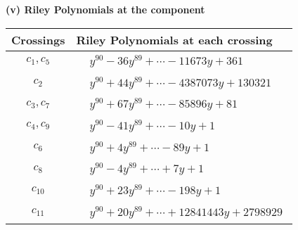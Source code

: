 \documentclass[1p]{elsarticle_modified}
\theoremstyle{definition}
\begin{document}
\newpage\renewcommand{\arraystretch}{1}
\flushleft \textbf{(v) Riley Polynomials at the component}\newline \\
\begin{tabular}{m{50pt}|m{274pt}}
Crossings & \hspace{64pt}Riley Polynomials at each crossing \\
\hline $$\begin{aligned}c_{1},c_{5}\end{aligned}$$&$\begin{aligned}
&y^{90}-36 y^{89}+\cdots-11673 y+361
\end{aligned}$\\
\hline $$\begin{aligned}c_{2}\end{aligned}$$&$\begin{aligned}
&y^{90}+44 y^{89}+\cdots-4387073 y+130321
\end{aligned}$\\
\hline $$\begin{aligned}c_{3},c_{7}\end{aligned}$$&$\begin{aligned}
&y^{90}+67 y^{89}+\cdots-85896 y+81
\end{aligned}$\\
\hline $$\begin{aligned}c_{4},c_{9}\end{aligned}$$&$\begin{aligned}
&y^{90}-41 y^{89}+\cdots-10 y+1
\end{aligned}$\\
\hline $$\begin{aligned}c_{6}\end{aligned}$$&$\begin{aligned}
&y^{90}+4 y^{89}+\cdots-89 y+1
\end{aligned}$\\
\hline $$\begin{aligned}c_{8}\end{aligned}$$&$\begin{aligned}
&y^{90}-4 y^{89}+\cdots+7 y+1
\end{aligned}$\\
\hline $$\begin{aligned}c_{10}\end{aligned}$$&$\begin{aligned}
&y^{90}+23 y^{89}+\cdots-198 y+1
\end{aligned}$\\
\hline $$\begin{aligned}c_{11}\end{aligned}$$&$\begin{aligned}
&y^{90}+20 y^{89}+\cdots+12841443 y+2798929
\end{aligned}$\\
\hline
\end{tabular}\\~\\
\end{document}
